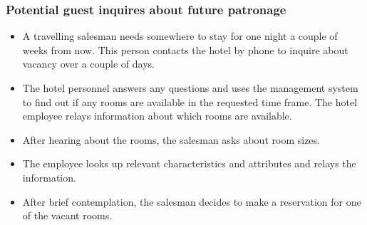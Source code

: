 \subsubsection{Potential guest inquires about future patronage}\label{scenario1}
%
%
%
%
\begin{itemize}
  \item A travelling salesman needs somewhere to stay for one night a couple of
    weeks from now.  This person contacts the hotel by phone to inquire about
    vacancy over a couple of days.  
    
  \item The hotel personnel answers any questions and uses the management
    system to find out if any rooms are available in the requested time frame.
    The hotel employee relays information about which rooms are available.

  \item After hearing about the rooms, the salesman asks about room sizes.

  \item The employee looks up relevant characteristics and attributes and
    relays the information.

  \item After brief contemplation, the salesman decides to make a reservation
    for one of the vacant rooms. 
\end{itemize}


